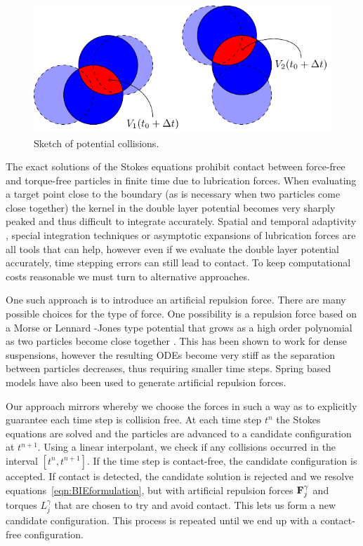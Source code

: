 \documentclass[preprint, 10pt]{elsarticle}
\begin{document}
\begin{figure}[!h]\label{fig:collision_sketch}
\begin{center}
\includegraphics{figures/collisions.pdf}
\end{center}
\caption{Sketch of potential collisions.}
\end{figure}
The exact solutions of the Stokes equations prohibit contact between
force-free and torque-free particles in finite time due to lubrication
forces. When evaluating a target point close to the boundary (as is necessary when two particles come close together) the kernel in the double layer potential becomes very sharply peaked and thus difficult to integrate accurately. Spatial and temporal adaptivity \cite{Kropinski1999}, special integration techniques \cite{Klockner2013, Ying2006} or asymptotic expansions of lubrication forces \cite{Mammoli2006} are all tools that can help, however even if we evaluate the double layer potential accurately, time stepping errors can still lead to contact. To keep computational costs reasonable we must turn to alternative approaches. 

One such approach is to introduce an artificial repulsion force. There
are many possible choices for the type of force. One possibility is a repulsion force based on a Morse or 
Lennard -Jones type potential that grows as a high order polynomial as two particles become close together \cite{Flormann2017, Liu2006}. This has been shown to work for dense
suspensions, however the resulting ODEs become very stiff as the
separation between particles decreases, thus requiring smaller time
steps. Spring based models \cite{Tsubota2006, Zhao2013, Kabacogulu2017} have also been used to generate artificial repulsion forces.

Our approach mirrors \cite{Lu2017} whereby we choose the forces in such a way as to
explicitly guarantee each time step is collision free.  At each time
step $t^n$ the Stokes equations are solved and the particles are
advanced to a candidate configuration at $t^{n+1}$.  Using a linear
interpolant, we check if any collisions occurred in the interval
$[t^n,t^{n+1}]$.  If the time step is contact-free, the candidate
configuration is accepted.  If contact is detected, the candidate
solution is rejected and we resolve
equations~\eqref{eqn:BIEformulation}, but with artificial repulsion forces ${\mathbf{F}}^\gamma_j$ and torques
$L^\gamma_j$ that are chosen to try and avoid contact.  This lets us form a new candidate configuration. This process is repeated until we end up with a contact-free configuration.
\end{document}
